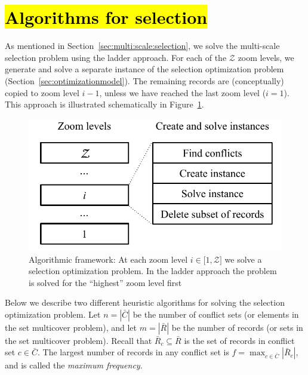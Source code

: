 \section{\hl{Algorithms for selection}}
\label{sec:algorithms}

As mentioned in Section~\ref{sec:multi:scale:selection}, we solve the multi-scale selection problem using the ladder approach. For each of the $\mathcal{Z}$ zoom levels, we generate and solve a separate instance of the selection optimization problem (Section~\ref{sec:optimizationmodel}). The remaining records are (conceptually) copied to zoom level $i-1$, unless we have reached the last zoom level ($i=1$). This approach is illustrated schematically in Figure~\ref{fig:algorithmic-framework}.


\begin{figure}[htbp]
\begin{center}
\includegraphics[scale=.6]{figs/cvl_stages.pdf}
\caption{Algorithmic framework: At each zoom level $i \in \lbrack 1, \mathcal{Z} \rbrack$ we solve a selection optimization problem. In the ladder approach the problem is solved for the ``highest'' zoom level first}
\label{fig:algorithmic-framework}
\end{center}
\end{figure}

Below we describe two different heuristic algorithms for solving the selection optimization problem. Let $n=|\bar{C}|$ be the number of conflict sets (or elements in the set multicover problem), and let $m=|\bar{R}|$ be the number of records (or sets in the set multicover problem). Recall that $\bar{R}_c \subseteq \bar{R}$ is the set of records in conflict set $c \in \bar{C}$. The largest number of records in any conflict set is $f = \max_{c \in \bar{C}} |\bar{R}_c|$, and is called the \emph{maximum frequency}.


